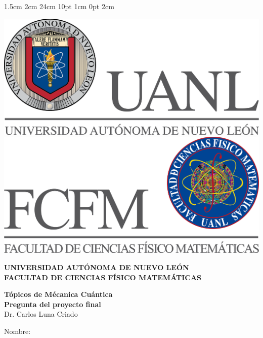 \documentclass[12pt,letterpaper]{report}
\begin{document}
\setmargins{2.5cm}      
{1.5cm}                     
{2cm}  
{24cm}                    
{10pt}                          
{1cm}                          
{0pt}                             
{2cm}
\begin{titlepage}
\begin{center}
\includegraphics[scale=0.40]{../../Logos/uanl.png} 
\hspace{2.5cm}
\includegraphics[scale=0.40]{../../Logos/fcfm.png}
\end{center}
\vspace{2cm}
\begin{center}
\textbf{
UNIVERSIDAD AUTÓNOMA DE NUEVO LEÓN\\
FACULTAD DE CIENCIAS
    FÍSICO MATEMÁTICAS}\\
\vspace*{2cm}
\begin{large}
\vspace{1cm}
\large{\textbf{Tópicos de Mécanica Cuántica}}\\
\textbf{Pregunta del proyecto final}\\
Dr. Carlos Luna Criado\\
\end{large}
\vspace{3.5cm}
\begin{minipage}{0.6\linewidth}
\changefontsizes{14pt}
Nombre:\\                                                                                                                                                                                                                                                           

\end{minipage}
\end{center}
\end{titlepage}
\end{document}
